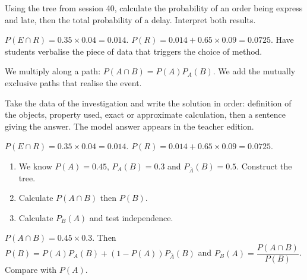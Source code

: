     \begin{activity}
    Using the tree from session 40, calculate the probability of an order being express and late, then the total probability of a delay. Interpret both results.
    \begin{center}\end{center}
    \end{activity}
    \begin{solution}$P(E\cap R)=\num{0,35}\times\num{0,04}=\num{0,014}$. $P(R)=\num{0,014}+\num{0,65}\times\num{0,09}=\num{0,0725}$. Have students verbalise the piece of data that triggers the choice of method.\end{solution}

    \begin{summary}We multiply along a path: $P(A\cap B)=P(A)P_A(B)$. We add the mutually exclusive paths that realise the event.\end{summary}

    \begin{example}
    Take the data of the investigation and write the solution in order: definition of the objects, property used, exact or approximate calculation, then a sentence giving the answer. The model answer appears in the teacher edition.
    \end{example}
    \begin{solution}$P(E\cap R)=\num{0,35}\times\num{0,04}=\num{0,014}$. $P(R)=\num{0,014}+\num{0,65}\times\num{0,09}=\num{0,0725}$.\end{solution}

    \begin{exercise}[essential]
    \begin{enumerate}\item We know $P(A)=\num{0,45}$, $P_A(B)=\num{0,3}$ and $P_{\overline A}(B)=\num{0,5}$. Construct the tree.\item Calculate $P(A\cap B)$ then $P(B)$.\item Calculate $P_B(A)$ and test independence.\end{enumerate}
    \end{exercise}
    \begin{solution}$P(A\cap B)=\num{0,45}\times\num{0,3}$. Then $P(B)=P(A)P_A(B)+(1-P(A))P_{\overline A}(B)$ and $P_B(A)=\dfrac{P(A\cap B)}{P(B)}$. Compare with $P(A)$.\end{solution}

